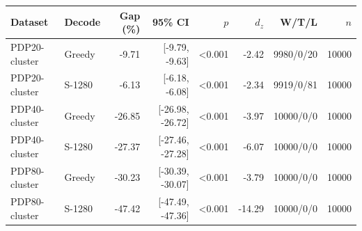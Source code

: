 \begin{tabular}{llrrrrrr}\toprule
Dataset & Decode & Gap (\%) & 95\% CI & $p$ & $d_z$ & W/T/L & $n$ \\
\midrule
PDP20-cluster & Greedy & -9.71 & [-9.79, -9.63] & <0.001 & -2.42 & 9980/0/20 & 10000 \\
PDP20-cluster & S-1280 & -6.13 & [-6.18, -6.08] & <0.001 & -2.34 & 9919/0/81 & 10000 \\
PDP40-cluster & Greedy & -26.85 & [-26.98, -26.72] & <0.001 & -3.97 & 10000/0/0 & 10000 \\
PDP40-cluster & S-1280 & -27.37 & [-27.46, -27.28] & <0.001 & -6.07 & 10000/0/0 & 10000 \\
PDP80-cluster & Greedy & -30.23 & [-30.39, -30.07] & <0.001 & -3.79 & 10000/0/0 & 10000 \\
PDP80-cluster & S-1280 & -47.42 & [-47.49, -47.36] & <0.001 & -14.29 & 10000/0/0 & 10000 \\
\bottomrule
\end{tabular}
